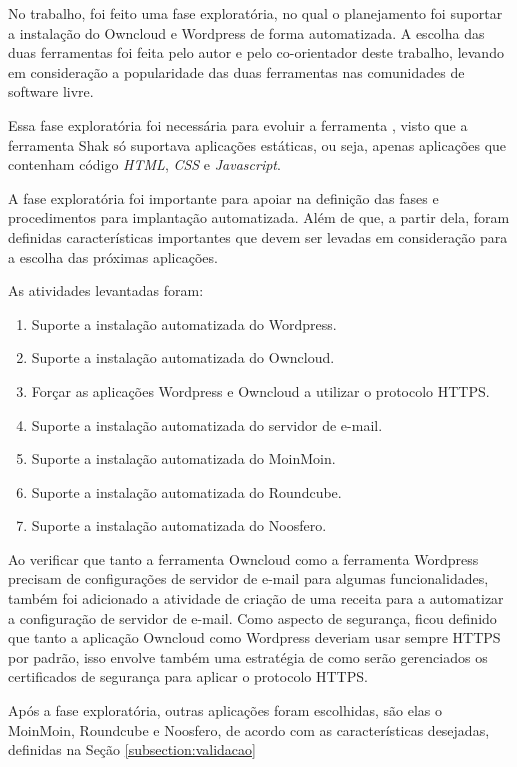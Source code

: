 No trabalho, foi feito uma fase exploratória, no qual o planejamento foi
suportar a instalação do Owncloud e Wordpress de forma 
automatizada. A escolha das duas ferramentas foi feita pelo autor e pelo co-orientador
deste trabalho, levando em consideração a popularidade das duas ferramentas nas 
comunidades de software livre. 

Essa fase exploratória foi necessária para evoluir a ferramenta
, visto que a ferramenta Shak só suportava aplicações estáticas, ou seja, apenas 
aplicações que contenham 
código \textit{HTML}, \textit{CSS} e \textit{Javascript}. 

A fase exploratória foi importante para apoiar na definição das fases e 
procedimentos para implantação
automatizada. Além de que, a partir dela, foram definidas características importantes 
que devem ser levadas em consideração para a escolha das próximas aplicações.

As atividades levantadas foram:

 \begin{enumerate}
   \item  Suporte a instalação automatizada do Wordpress.
   \item  Suporte a instalação automatizada do Owncloud.
   \item  Forçar as aplicações Wordpress e Owncloud a
   utilizar o protocolo HTTPS.
   \item  Suporte a instalação automatizada do servidor de e-mail.
   \item  Suporte a instalação automatizada do MoinMoin.
   \item  Suporte a instalação automatizada do Roundcube.
   \item  Suporte a instalação automatizada do Noosfero.
 \end{enumerate}

Ao verificar que tanto a ferramenta Owncloud como a ferramenta Wordpress precisam
de configurações de servidor de e-mail para algumas funcionalidades, também foi adicionado
a atividade de criação de uma receita para a automatizar a configuração de
servidor de e-mail. Como aspecto de segurança, ficou definido que tanto a aplicação
Owncloud como Wordpress deveriam usar sempre HTTPS por padrão, isso envolve também
uma estratégia de como serão gerenciados os certificados de segurança para aplicar
o protocolo HTTPS. 

Após a fase exploratória, outras aplicações foram escolhidas, são elas o MoinMoin, 
Roundcube e Noosfero, de acordo com as características desejadas, 
definidas na Seção \ref{subsection:validacao}

